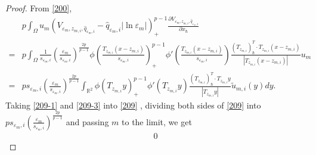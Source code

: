 \documentclass[10pt,a4paper]{amsart}
\begin{document}
\begin{proof}
From  \eqref{200},
\begin{equation}\label{209-3}
\begin{split}
&p\int_{\Omega} u_m\left (V_{\varepsilon_m, z_{m,i}, \hat{q}_{\varepsilon_m,i}}-\hat{q}_{\varepsilon_m,i}|\ln\varepsilon_m|\right )^{p-1}_+ \frac{\partial V_{\varepsilon_m, z_{m,i}, \hat{q}_{\varepsilon_m,i}}}{\partial x_\hbar}\\
=&p\int_{\Omega}\frac{1}{s_{\varepsilon_m,i}}\left( \frac{\varepsilon_m}{s_{\varepsilon_m,i}}\right)^{\frac{2p}{p-1}} \phi\left( \frac{T_{z_{m,i}}(x-z_{m,i})}{s_{\varepsilon_m,i}}\right)^{p-1}_+\phi'\left( \frac{T_{z_{m,i}}(x-z_{m,i})}{s_{\varepsilon_m,i}}\right)\frac{(T_{z_{m,i}})_\hbar^T\cdot T_{z_{m,i}}(x-z_{m,i})}{|T_{z_{m,i}}(x-z_{m,i})|}u_m\\
=&ps_{\varepsilon_m,i}\left( \frac{\varepsilon_m}{s_{\varepsilon_m,i}}\right)^{\frac{2p}{p-1}}\int_{\mathbb{R}^2}\phi(T_{z_{m,i}}y)^{p-1}_+\phi'(T_{z_{m,i}}y)\frac{(T_{z_{m,i}})_\hbar^T\cdot T_{z_{m,i}}y}{|T_{z_{m,i}}y|}\tilde{u}_{m,i}(y)dy.
\end{split}
\end{equation}
Taking \eqref{209-1}  and \eqref{209-3} into \eqref{209}
, dividing both sides of \eqref{209} into $ ps_{\varepsilon_m,i}(\frac{\varepsilon_m}{s_{\varepsilon_m,i}})^{\frac{2p}{p-1}} $ and passing $ m $ to the limit, we get
\begin{equation*}
\begin{split}
0%

\end{split}
\end{equation*}
\end{proof}
\end{document}
